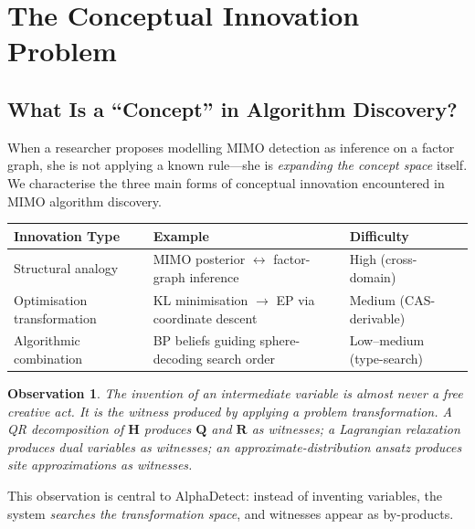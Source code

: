 \documentclass[12pt,a4paper]{article}
\newtheorem{observation}{Observation}[section]
\newcommand{\bH}{\mathbf{H}}
\begin{document}
\section{The Conceptual Innovation Problem}
\label{sec:concept}

\subsection{What Is a ``Concept'' in Algorithm Discovery?}

When a researcher proposes modelling MIMO detection as inference on a factor
graph, she is not applying a known rule---she is \emph{expanding the concept
space} itself.  We characterise the three main forms of conceptual innovation
encountered in MIMO algorithm discovery.

\vspace{0.5em}
\begin{tabular}{@{}p{4.0cm}p{6.5cm}p{2.8cm}@{}}
  \toprule
  \textbf{Innovation Type} & \textbf{Example} & \textbf{Difficulty} \\
  \midrule
  Structural analogy & MIMO posterior $\leftrightarrow$ factor-graph inference
    & High (cross-domain) \\
  Optimisation transformation & KL minimisation $\to$ EP via coordinate descent
    & Medium (CAS-derivable) \\
  Algorithmic combination & BP beliefs guiding sphere-decoding search order
    & Low--medium (type-search) \\
  \bottomrule
\end{tabular}
\vspace{0.5em}

\begin{observation}
  The invention of an intermediate variable is almost never a free creative act.
  It is the \emph{witness} produced by applying a problem transformation.
  A QR decomposition of $\bH$ produces $\mathbf{Q}$ and $\mathbf{R}$ as
  witnesses; a Lagrangian relaxation produces dual variables as witnesses;
  an approximate-distribution ansatz produces site approximations as witnesses.
\end{observation}

\noindent
This observation is central to AlphaDetect: instead of inventing variables, the
system \emph{searches the transformation space}, and witnesses appear as
by-products.
\end{document}

